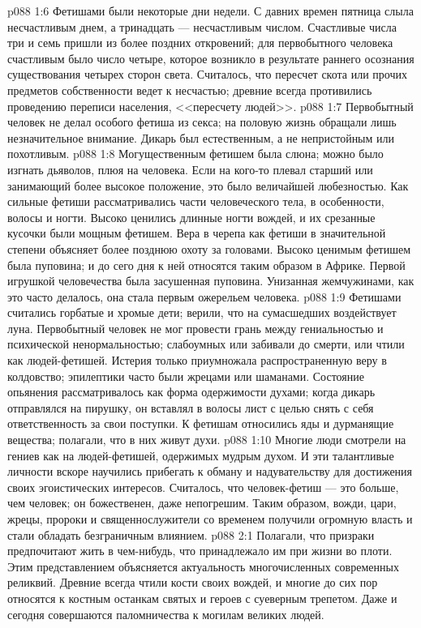 \vs p088 1:6 Фетишами были некоторые дни недели. С давних времен пятница слыла несчастливым днем, а тринадцать --- несчастливым числом. Счастливые числа три и семь пришли из более поздних откровений; для первобытного человека счастливым было число четыре, которое возникло в результате раннего осознания существования четырех сторон света. Считалось, что пересчет скота или прочих предметов собственности ведет к несчастью; древние всегда противились проведению переписи населения, <<пересчету людей>>.
\vs p088 1:7 Первобытный человек не делал особого фетиша из секса; на половую жизнь обращали лишь незначительное внимание. Дикарь был естественным, а не непристойным или похотливым.
\vs p088 1:8 Могущественным фетишем была слюна; можно было изгнать дьяволов, плюя на человека. Если на кого\hyp{}то плевал старший или занимающий более высокое положение, это было величайшей любезностью. Как сильные фетиши рассматривались части человеческого тела, в особенности, волосы и ногти. Высоко ценились длинные ногти вождей, и их срезанные кусочки были мощным фетишем. Вера в черепа как фетиши в значительной степени объясняет более позднюю охоту за головами. Высоко ценимым фетишем была пуповина; и до сего дня к ней относятся таким образом в Африке. Первой игрушкой человечества была засушенная пуповина. Унизанная жемчужинами, как это часто делалось, она стала первым ожерельем человека.
\vs p088 1:9 Фетишами считались горбатые и хромые дети; верили, что на сумасшедших воздействует луна. Первобытный человек не мог провести грань между гениальностью и психической ненормальностью; слабоумных или забивали до смерти, или чтили как людей\hyp{}фетишей. Истерия только приумножала распространенную веру в колдовство; эпилептики часто были жрецами или шаманами. Состояние опьянения рассматривалось как форма одержимости духами; когда дикарь отправлялся на пирушку, он вставлял в волосы лист с целью снять с себя ответственность за свои поступки. К фетишам относились яды и дурманящие вещества; полагали, что в них живут духи.
\vs p088 1:10 Многие люди смотрели на гениев как на людей\hyp{}фетишей, одержимых мудрым духом. И эти талантливые личности вскоре научились прибегать к обману и надувательству для достижения своих эгоистических интересов. Считалось, что человек\hyp{}фетиш --- это больше, чем человек; он божественен, даже непогрешим. Таким образом, вожди, цари, жрецы, пророки и священнослужители со временем получили огромную власть и стали обладать безграничным влиянием.
\vs p088 2:1 Полагали, что призраки предпочитают жить в чем\hyp{}нибудь, что принадлежало им при жизни во плоти. Этим представлением объясняется актуальность многочисленных современных реликвий. Древние всегда чтили кости своих вождей, и многие до сих пор относятся к костным останкам святых и героев с суеверным трепетом. Даже и сегодня совершаются паломничества к могилам великих людей.
